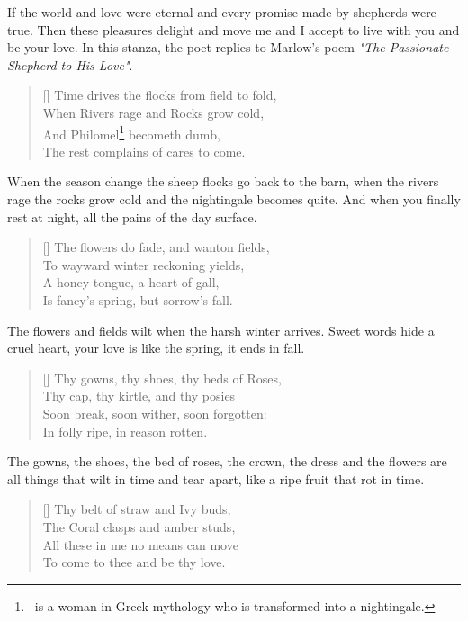 \documentclass[12pt, a4paper]{article}
\begin{document}
If the world and love were eternal and every promise made by shepherds were true.
Then these pleasures delight and move me and I accept to live with you and be 
your love. In this stanza, the poet replies to Marlow's poem \textit{"The 
Passionate Shepherd to His Love"}. 


\begin{verse}[\versewidth]
{\fontverse
Time drives the flocks from field to fold,\\
When Rivers rage and Rocks grow cold,\\
And Philomel\footnote{\, is a woman in Greek mythology who is 
transformed into a nightingale.} becometh dumb,\\
The rest complains of cares to come.
} 
\end{verse}

When the season change the sheep flocks go back to the barn,
when the rivers rage the rocks grow cold and the nightingale becomes
quite. And when you finally rest at night, all the pains of the day
surface.


\newpage
\begin{verse}[\versewidth]
{\fontverse
The flowers do fade, and wanton fields,\\
To wayward winter reckoning yields,\\
A honey tongue, a heart of gall,\\
Is fancy’s spring, but sorrow’s fall.
} 
\end{verse}

The flowers and fields wilt when the harsh winter arrives. Sweet words
hide a cruel heart, your love is like the spring, it ends in fall.

\begin{verse}[\versewidth]
{\fontverse
Thy gowns, thy shoes, thy beds of Roses,\\
Thy cap, thy kirtle, and thy posies\\
Soon break, soon wither, soon forgotten:\\
In folly ripe, in reason rotten.
} 
\end{verse}

The gowns, the shoes, the bed of roses, the crown, the dress and the flowers
are all things that wilt in time and tear apart, like a ripe fruit that
rot in time.

\begin{verse}[\versewidth]
{\fontverse
Thy belt of straw and Ivy buds,\\
The Coral clasps and amber studs,\\
All these in me no means can move\\
To come to thee and be thy love.
} 
\end{verse}
\end{document}
